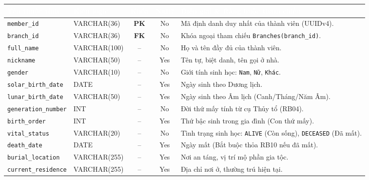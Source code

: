 \begin{table}[H]
    \centering
    \small
    \renewcommand{\arraystretch}{1.2}
    \begin{tabularx}{\textwidth}{p{3.4cm} p{2.4cm} c c X}
        \toprule
        \rowcolor{tableheader}\textcolor{white}{\textbf{Tên thuộc tính}} & \textcolor{white}{\textbf{Kiểu logic}} & \textcolor{white}{\textbf{Khóa}} & \textcolor{white}{\textbf{Null?}} & \textcolor{white}{\textbf{Diễn giải \& Ràng buộc tham chiếu}} \\
        \midrule
        \rowcolor{tablerowalt}
        \texttt{member\_id} & VARCHAR(36) & \textcolor{pkcolor}{\textbf{PK}} & No & Mã định danh duy nhất của thành viên (UUIDv4). \\
        \texttt{branch\_id} & VARCHAR(36) & \textcolor{fkcolor}{\textbf{FK}} & No & Khóa ngoại tham chiếu \texttt{Branches(branch\_id)}. \\
        \rowcolor{tablerowalt}
        \texttt{full\_name} & VARCHAR(100) & -- & No & Họ và tên đầy đủ của thành viên. \\
        \texttt{nickname} & VARCHAR(50) & -- & Yes & Tên tự, biệt danh, tên gọi ở nhà. \\
        \rowcolor{tablerowalt}
        \texttt{gender} & VARCHAR(10) & -- & No & Giới tính sinh học: \texttt{Nam}, \texttt{Nữ}, \texttt{Khác}. \\
        \texttt{solar\_birth\_date} & DATE & -- & Yes & Ngày sinh theo Dương lịch. \\
        \rowcolor{tablerowalt}
        \texttt{lunar\_birth\_date} & VARCHAR(50) & -- & Yes & Ngày sinh theo Âm lịch (Canh/Tháng/Năm Âm). \\
        \texttt{generation\_number} & INT & -- & No & Đời thứ mấy tính từ cụ Thủy tổ (RB04). \\
        \rowcolor{tablerowalt}
        \texttt{birth\_order} & INT & -- & Yes & Thứ bậc sinh trong gia đình (Con thứ mấy). \\
        \texttt{vital\_status} & VARCHAR(20) & -- & No & Tình trạng sinh học: \texttt{ALIVE} (Còn sống), \texttt{DECEASED} (Đã mất). \\
        \rowcolor{tablerowalt}
        \texttt{death\_date} & DATE & -- & Yes & Ngày mất (Bắt buộc thỏa RB10 nếu đã mất). \\
        \texttt{burial\_location} & VARCHAR(255) & -- & Yes & Nơi an táng, vị trí mộ phần gia tộc. \\
        \rowcolor{tablerowalt}
        \texttt{current\_residence} & VARCHAR(255) & -- & Yes & Địa chỉ nơi ở, thường trú hiện tại. \\

\end{tabularx}
\end{table}
